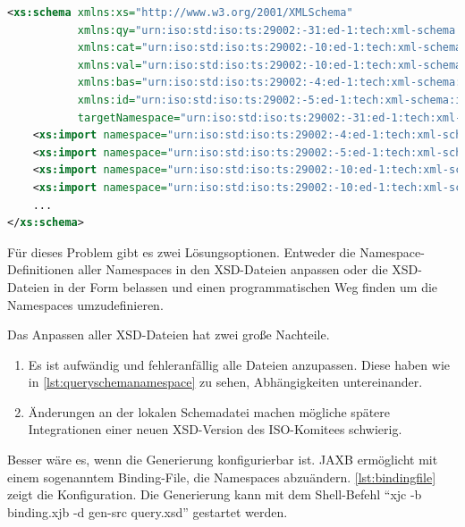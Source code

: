 \begin{lstlisting}[caption=query.xsd Namespace Definitionen, language=XML, label=lst:queryschemanamespace]
<xs:schema xmlns:xs="http://www.w3.org/2001/XMLSchema"
           xmlns:qy="urn:iso:std:iso:ts:29002:-31:ed-1:tech:xml-schema:query"
           xmlns:cat="urn:iso:std:iso:ts:29002:-10:ed-1:tech:xml-schema:catalogue"
           xmlns:val="urn:iso:std:iso:ts:29002:-10:ed-1:tech:xml-schema:value"
           xmlns:bas="urn:iso:std:iso:ts:29002:-4:ed-1:tech:xml-schema:basic"
           xmlns:id="urn:iso:std:iso:ts:29002:-5:ed-1:tech:xml-schema:identifier"
           targetNamespace="urn:iso:std:iso:ts:29002:-31:ed-1:tech:xml-schema:query" elementFormDefault="qualified">
    <xs:import namespace="urn:iso:std:iso:ts:29002:-4:ed-1:tech:xml-schema:basic" schemaLocation="basic.xsd"/>
    <xs:import namespace="urn:iso:std:iso:ts:29002:-5:ed-1:tech:xml-schema:identifier" schemaLocation="identifier.xsd"/>
    <xs:import namespace="urn:iso:std:iso:ts:29002:-10:ed-1:tech:xml-schema:catalogue" schemaLocation="catalogue.xsd"/>
    <xs:import namespace="urn:iso:std:iso:ts:29002:-10:ed-1:tech:xml-schema:value" schemaLocation="value.xsd"/>
    ...
</xs:schema>    
\end{lstlisting}

Für dieses Problem gibt es zwei Lösungsoptionen. Entweder die Namespace-Definitionen aller Namespaces in den XSD-Dateien anpassen oder die XSD-Dateien in der Form belassen und einen programmatischen Weg finden um die Namespaces umzudefinieren. 

Das Anpassen aller XSD-Dateien hat zwei große Nachteile.
\begin{enumerate}
\item Es ist aufwändig und fehleranfällig alle Dateien anzupassen. Diese haben wie in \autoref{lst:queryschemanamespace} zu sehen, Abhängigkeiten untereinander.
\item Änderungen an der lokalen Schemadatei machen mögliche spätere Integrationen einer neuen XSD-Version des ISO-Komitees schwierig.
\end{enumerate}

Besser wäre es, wenn die Generierung konfigurierbar ist. \gls{JAXB} ermöglicht mit einem sogenanntem Binding-File, die Namespaces abzuändern. \autoref{lst:bindingfile} zeigt die Konfiguration. Die Generierung kann mit dem Shell-Befehl \enquote{xjc -b binding.xjb -d gen-src query.xsd} gestartet werden.  

